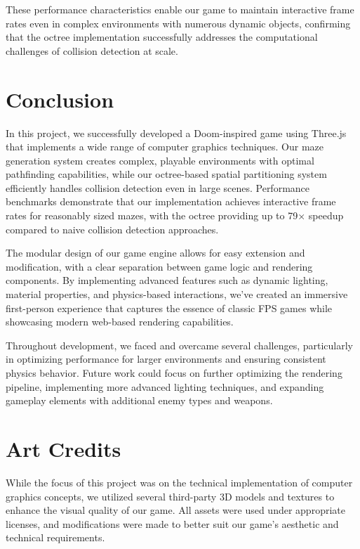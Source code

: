 \documentclass{article}
\begin{document}
These performance characteristics enable our game to maintain interactive frame
rates even in complex environments with numerous dynamic objects, confirming
that the octree implementation successfully addresses the computational
challenges of collision detection at scale.

\section{Conclusion}
In this project, we successfully developed a Doom-inspired game using Three.js
that implements a wide range of computer graphics techniques. Our maze
generation system creates complex, playable environments with optimal
pathfinding capabilities, while our octree-based spatial partitioning system
efficiently handles collision detection even in large scenes. Performance
benchmarks demonstrate that our implementation achieves interactive frame rates
for reasonably sized mazes, with the octree providing up to 79× speedup
compared to naive collision detection approaches.

The modular design of our game engine allows for easy extension and
modification, with a clear separation between game logic and rendering
components. By implementing advanced features such as dynamic lighting,
material properties, and physics-based interactions, we've created an immersive
first-person experience that captures the essence of classic FPS games while
showcasing modern web-based rendering capabilities.

Throughout development, we faced and overcame several challenges, particularly
in optimizing performance for larger environments and ensuring consistent
physics behavior. Future work could focus on further optimizing the rendering
pipeline, implementing more advanced lighting techniques, and expanding
gameplay elements with additional enemy types and weapons.


\pagebreak
\section{Art Credits}
While the focus of this project was on the technical implementation of computer graphics concepts, we utilized several third-party 3D models and textures to enhance the visual quality of our game. All assets were used under appropriate licenses, and modifications were made to better suit our game's aesthetic and technical requirements.
\end{document}
